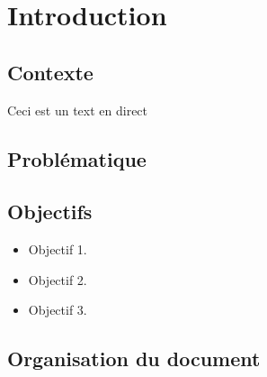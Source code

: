 \chapter{Introduction}

\section{Contexte}
Ceci est un text en direct
\section{Problématique}

\section{Objectifs}
\begin{itemize}
  \item Objectif 1.
  \item Objectif 2.
  \item Objectif 3.
\end{itemize}

\section{Organisation du document}

